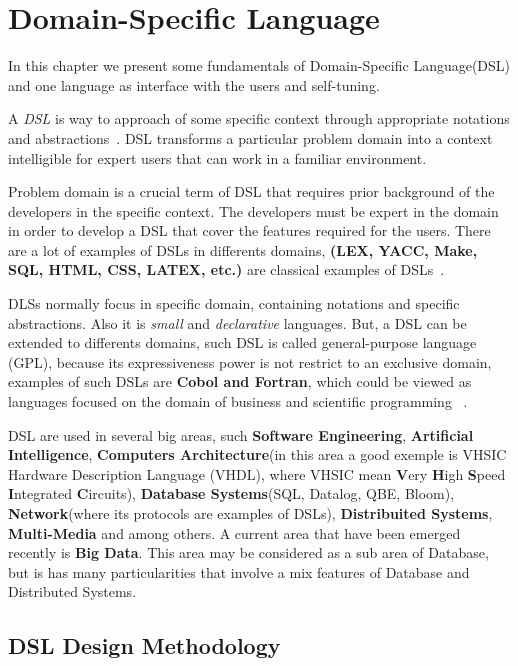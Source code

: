 \chapter{Domain-Specific Language} %
\label{cha:dsl}

In this chapter we present some fundamentals of Domain-Specific Language(DSL) and
one language as interface with the users and self-tuning.

A \textit{DSL} is way to approach of some specific
context through appropriate notations and abstractions~\cite{deursen:2000}. DSL
transforms a particular problem domain into a context intelligible for expert
users that can work in a familiar environment.

Problem domain is a crucial term of DSL that requires prior background of the
developers in the specific context. The developers must be expert in the domain
in order to develop a DSL that cover the features required for the users. There are
a lot of examples of DSLs in differents domains, \textbf{(LEX, YACC, Make, SQL,
HTML, CSS, LATEX, etc.)} are classical examples of DSLs~\cite{bentley:1986}.

DLSs normally focus in specific domain, containing notations and specific abstractions.
Also it is \textit{small} and \textit{declarative} languages. But, a
DSL can be extended to differents domains, such DSL is called general-purpose
language (GPL), because its expressiveness power is not restrict to
an exclusive domain, examples of such DSLs are \textbf{Cobol and Fortran}, which
could be viewed as languages focused on the domain of business and scientific
programming  ~\cite{deursen:2000}.

DSL are used in several big areas, such \textbf{Software Engineering}, 
\textbf{Artificial Intelligence}, \textbf{Computers Architecture}(in this area a
good exemple is VHSIC Hardware Description Language (VHDL), where VHSIC mean 
{\bf V}ery {\bf H}igh {\bf S}peed {\bf I}ntegrated {\bf C}ircuits), \textbf{Database
Systems}(SQL, Datalog, QBE, Bloom), \textbf{Network}(where its
protocols are examples of DSLs), \textbf{Distribuited Systems}, \textbf{Multi-Media}
and among others. A current area that have been emerged recently is \textbf{Big Data}.
This area may be considered as a sub area of Database, but is has many
particularities that involve a mix features of Database and Distributed Systems.

\section{DSL Design Methodology}

